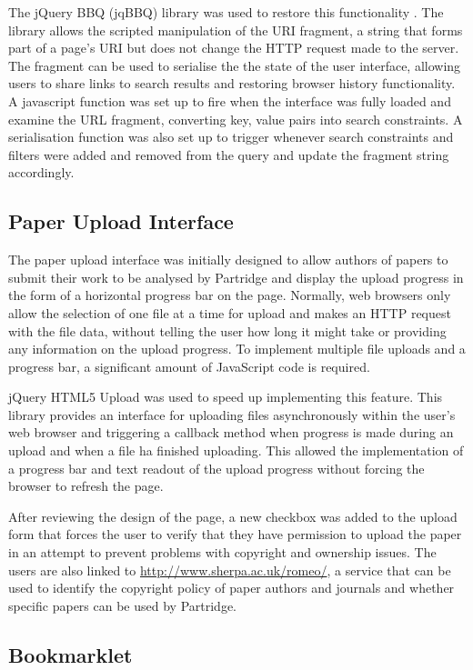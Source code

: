 The jQuery BBQ (jqBBQ) library was used to restore this functionality
\cite{jqbbq2013}. The library allows the scripted manipulation of the URI
fragment, a string that forms part of a page's URI but does not change the HTTP
request made to the server\cite{urifragment2013}. The fragment can be used to
serialise the the state of the user interface, allowing users to share links to
search results and restoring browser history functionality. A javascript
function was set up to fire when the interface was fully loaded and examine the
URL fragment, converting key, value pairs into search constraints. A
serialisation function was also set up to trigger whenever search constraints
and filters were added and removed from the query and update the fragment
string accordingly.

\subsection{ Paper Upload Interface }

The paper upload interface was initially designed to allow authors of papers to
submit their work to be analysed by Partridge and display the upload progress
in the form of a horizontal progress bar on the page. Normally, web browsers
only allow the selection of one file at a time for upload and makes an HTTP
request with the file data, without telling the user how long it might take or
providing any information on the upload progress. To implement multiple file
uploads and a progress bar, a significant amount of JavaScript code is
required. 

jQuery HTML5 Upload was used to speed up implementing this feature. This
library provides an interface for uploading files asynchronously within the
user's web browser and triggering a callback method when progress is made
during an upload and when a file ha finished uploading. This allowed the
implementation of a progress bar and text readout of the upload progress
without forcing the browser to refresh the page.

After reviewing the design of the page, a new checkbox was added to the upload
form that forces the user to verify that they have permission to upload the
paper in an attempt to prevent problems with copyright and ownership issues.
The users are also linked to \url{http://www.sherpa.ac.uk/romeo/}, a service
that can be used to identify the copyright policy of paper authors and
journals and whether specific papers can be used by Partridge. 

\subsection{ Bookmarklet }

